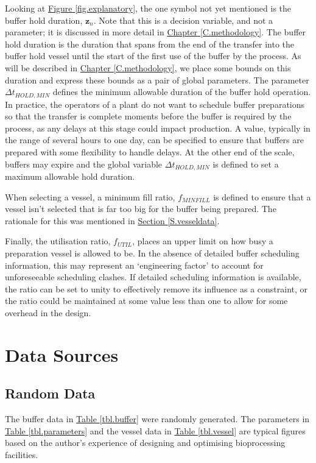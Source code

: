 Looking at \hyperref[fig.explanatory]{Figure \ref*{fig.explanatory}}, the one
symbol not yet mentioned is the buffer hold duration, $\boldsymbol{z}_{n}$.
Note that this is a decision variable, and not a parameter; it is discussed in
more detail in \hyperref[C.methodology]{Chapter \ref*{C.methodology}}.
The buffer hold duration is the duration that spans from the end of the
transfer into the buffer hold vessel until the start of the first use of the
buffer by the process.
As will be described in 
\hyperref[C.methodology]{Chapter \ref*{C.methodology}},
we place some bounds on this duration and express these bounds as a pair of
global parameters.
The parameter $\Delta t_{\mathit{HOLD,MIN}}$ defines the minimum allowable
duration of the buffer hold operation.
In practice, the operators of a plant do not want to schedule buffer
preparations so that the transfer is complete moments before the buffer is
required by the process, as any delays at this stage could impact production.
A value, typically in the range of several hours to one day, can be specified
to ensure that buffers are prepared with some flexibility to handle delays.
At the other end of the scale, buffers may expire and the global variable 
$\Delta t_{\mathit{HOLD,MIN}}$ is defined to set a maximum allowable hold
duration.

When selecting a vessel, a minimum fill ratio, $f_{\mathit{MINFILL}}$ is
defined to ensure that a vessel isn't selected that is far too big for the
buffer being prepared. The rationale for this was mentioned in
\hyperref[S.vesseldata]{Section \ref*{S.vesseldata}}.

Finally, the utilisation ratio, $f_{\mathit{UTIL}}$, places an upper limit on
how busy a preparation vessel is allowed to be.
In the absence of detailed buffer scheduling information, this may represent an
`engineering factor' to account for unforeseeable scheduling clashes.
If detailed scheduling information is available, the ratio can be set to unity
to effectively remove its influence as a constraint, or the ratio could be
maintained at some value less than one to allow for some overhead in the
design.

\section{Data Sources}\label{S.sources}

\subsection{Random Data}\label{SS.randomdata}
The buffer data in \hyperref[tbl.buffer]{Table \ref*{tbl.buffer}} were randomly
generated.  
The parameters in \hyperref[tbl.parameters]{Table \ref*{tbl.parameters}} and
the vessel data in \hyperref[tbl.vessel]{Table \ref*{tbl.vessel}} are typical
figures based on the author's experience of designing and optimising
bioprocessing facilities.

